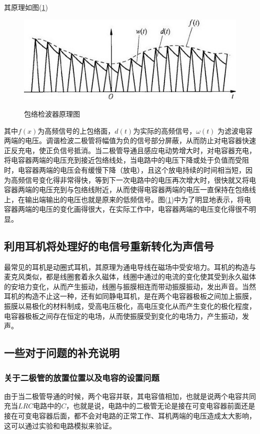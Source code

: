 \documentclass[10pt,a4paper]{article}
\theoremstyle{remark}
\begin{document}
其原理如图(\ref{principleOfEnvelopeDetector})
\begin{figure}
  \centering
  \includegraphics[scale = 0.8]{principleOfEnvelopeDetector(noText)}\\
  \caption{包络检波器原理图}\label{principleOfEnvelopeDetector}
\end{figure}
其中$f(x)$为高频信号的上包络面，$d(t)$为实际的高频信号，$\omega(t)$ 为滤波电容两端的电压。调谐检波二极管将幅值为负的信号部分屏蔽，从而防止对电容器快速正反充电，使正负信号抵消。当二极管导通且感应电动势增大时，对电容器充电，将电容器两端的电压充到接近包络线处，当电路中的电压下降或处于负值而受阻时，电容器两端的电压会有缓慢下降（放电），且这个放电持续的时间相当短，因为高频信号变化得非常得快，等到下一次电路中的电压再次增大时，很快就又将电容器两端的电压充到与包络线附近，从而使得电容器两端的电压一直保持在包络线上，在输出端输出的电压也就是原来的低频信号。图(\ref{principleOfEnvelopeDetector})中为了明显地表示，将电容器两端的电压的变化画得很大，在实际工作中，电容器两端的电压变化得很不明显。

\subsection{利用耳机将处理好的电信号重新转化为声信号}
最常见的耳机是动圈式耳机，其原理为通电导线在磁场中受安培力。耳机的构造与麦克风类似，都是线圈套着永久磁体，线圈中通过的电流的变化使其受到永久磁体的安培力变化，从而产生振动，线圈与振膜相连而带动振膜振动，发出声音。当然耳机的构造不止这一种，还有如同静电耳机，是在两个电容器极板之间加上振膜，振膜以易极化的材料制成，受高电压极化，高电压变化从而产生变化的极化程度，电容器极板之间存在恒定的电场，从而使振膜受到变化的电场力，产生振动，发声。
\subsection{一些对于问题的补充说明}
\subsubsection{关于二极管的放置位置以及电容的设置问题}
由于当二极管导通的时候，两个电容并联，其电容值相加，也就是说两个电容共同充当$LRC$电路中的$C$，也就是说，电路中的二极管无论是接在可变电容器前面还是接在可变电容器后面，都不会对电路的正常工作、耳机两端的电压造成太大影响，这可以通过实验和电路模拟来验证。
\end{document}
